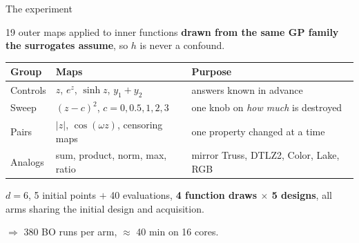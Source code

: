 \documentclass[aspectratio=169,11pt]{beamer}
\begin{document}
\begin{frame}{The experiment}

19 outer maps applied to inner functions \textbf{drawn from the same GP family
the surrogates assume}, so $h$ is never a confound.

\medskip
\begin{center}
\small
\begin{tabular}{lll}
\toprule
Group & Maps & Purpose \\
\midrule
Controls & $z$, \; $e^{z}$, \; $\sinh z$, \; $y_1+y_2$ & answers known in advance \\
Sweep & $(z-c)^2$, $c=0,0.5,1,2,3$ & one knob on \emph{how much} is destroyed \\
Pairs & $|z|$, $\cos(\omega z)$, censoring maps & one property changed at a time \\
Analogs & sum, product, norm, max, ratio & mirror Truss, DTLZ2, Color, Lake, RGB \\
\bottomrule
\end{tabular}
\end{center}

\bigskip
$d=6$, 5 initial points $+$ 40 evaluations, \textbf{4 function draws $\times$ 5
designs}, all arms sharing the initial design and acquisition.

\medskip
$\Rightarrow$ 380 BO runs per arm, $\approx$ 40 min on 16 cores.

\end{frame}
\end{document}
